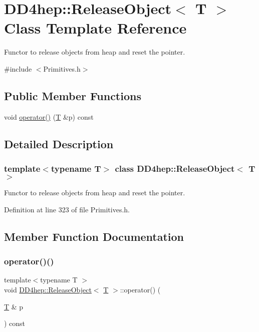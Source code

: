 \hypertarget{class_d_d4hep_1_1_release_object}{}\section{D\+D4hep\+:\+:Release\+Object$<$ T $>$ Class Template Reference}
\label{class_d_d4hep_1_1_release_object}


Functor to release objects from heap and reset the pointer.  




{\ttfamily \#include $<$Primitives.\+h$>$}

\subsection*{Public Member Functions}
\begin{DoxyCompactItemize}
\item 
void \hyperlink{class_d_d4hep_1_1_release_object_aecf78f75c5fb11e839a45c6f5325b674}{operator()} (\hyperlink{class_t}{T} \&p) const
\end{DoxyCompactItemize}


\subsection{Detailed Description}
\subsubsection*{template$<$typename T$>$\newline
class D\+D4hep\+::\+Release\+Object$<$ T $>$}

Functor to release objects from heap and reset the pointer. 

Definition at line 323 of file Primitives.\+h.



\subsection{Member Function Documentation}
\hypertarget{class_d_d4hep_1_1_release_object_aecf78f75c5fb11e839a45c6f5325b674}{}\label{class_d_d4hep_1_1_release_object_aecf78f75c5fb11e839a45c6f5325b674} 
\subsubsection{\texorpdfstring{operator()()}{operator()()}}
{\footnotesize\ttfamily template$<$typename T $>$ \\
void \hyperlink{class_d_d4hep_1_1_release_object}{D\+D4hep\+::\+Release\+Object}$<$ \hyperlink{class_t}{T} $>$\+::operator() (\begin{DoxyParamCaption}\item[{\hyperlink{class_t}{T} \&}]{p }\end{DoxyParamCaption}) const\hspace{0.3cm}{\ttfamily [inline]}}



